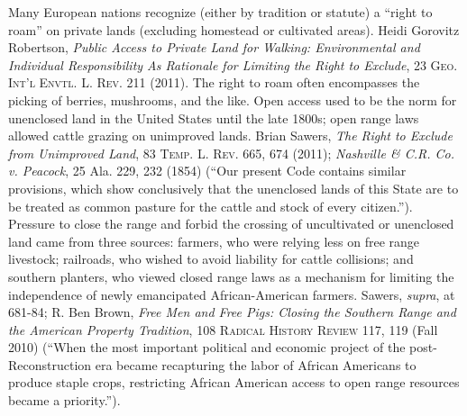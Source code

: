 \item Many European nations recognize (either by tradition or statute) a ``right
to roam'' on private lands (excluding homestead or cultivated areas). Heidi
Gorovitz Robertson, \emph{Public Access to Private Land for Walking:
Environmental and
Individual Responsibility As Rationale for Limiting the Right to Exclude}, 23
\textsc{Geo. Int'l Envtl. L. Rev}. 211 (2011). The right to roam often
encompasses the picking of berries, mushrooms, and the like. Open access used to
be the norm for unenclosed land in the United States until the late 1800s; open
range laws allowed cattle grazing on unimproved lands. Brian Sawers, \emph{The
Right to Exclude from Unimproved Land}, 83 \textsc{Temp. L. Rev}. 665, 674
(2011); \emph{Nashville \& C.R. Co. v. Peacock}, 25 Ala. 229, 232 (1854) (``Our
present
Code contains similar provisions, which show conclusively that the unenclosed
lands of this State are to be treated as common pasture for the cattle and stock
of every citizen.''). Pressure to close the range and forbid the crossing of
uncultivated or unenclosed land came from three sources: farmers, who were
relying less on free range livestock; railroads, who wished to avoid liability
for cattle collisions; and southern planters, who viewed closed range laws as a
mechanism for limiting the independence of newly emancipated African-American
farmers. Sawers, \emph{supra}, at 681-84; R. Ben Brown, \textit{Free Men and
Free Pigs: Closing the Southern Range and the American Property Tradition}, 108
\textsc{Radical History Review} 117, 119 (Fall 2010) (``When the most important
political
and economic project of the post-Reconstruction era became recapturing the labor
of African Americans to produce staple crops, restricting African American
access to open range resources became a priority.'').

